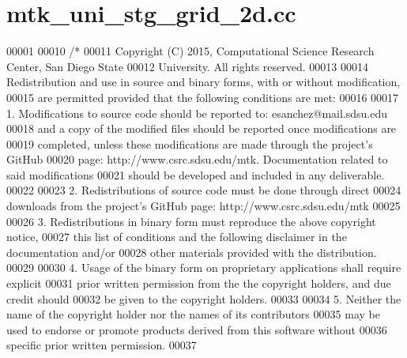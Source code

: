 \hypertarget{mtk__uni__stg__grid__2d_8cc_source}{\section{mtk\+\_\+uni\+\_\+stg\+\_\+grid\+\_\+2d.\+cc}
\label{mtk__uni__stg__grid__2d_8cc_source}
}

\begin{DoxyCode}
00001 
00010 \textcolor{comment}{/*}
00011 \textcolor{comment}{Copyright (C) 2015, Computational Science Research Center, San Diego State}
00012 \textcolor{comment}{University. All rights reserved.}
00013 \textcolor{comment}{}
00014 \textcolor{comment}{Redistribution and use in source and binary forms, with or without modification,}
00015 \textcolor{comment}{are permitted provided that the following conditions are met:}
00016 \textcolor{comment}{}
00017 \textcolor{comment}{1. Modifications to source code should be reported to: esanchez@mail.sdsu.edu}
00018 \textcolor{comment}{and a copy of the modified files should be reported once modifications are}
00019 \textcolor{comment}{completed, unless these modifications are made through the project's GitHub}
00020 \textcolor{comment}{page: http://www.csrc.sdsu.edu/mtk. Documentation related to said modifications}
00021 \textcolor{comment}{should be developed and included in any deliverable.}
00022 \textcolor{comment}{}
00023 \textcolor{comment}{2. Redistributions of source code must be done through direct}
00024 \textcolor{comment}{downloads from the project's GitHub page: http://www.csrc.sdsu.edu/mtk}
00025 \textcolor{comment}{}
00026 \textcolor{comment}{3. Redistributions in binary form must reproduce the above copyright notice,}
00027 \textcolor{comment}{this list of conditions and the following disclaimer in the documentation and/or}
00028 \textcolor{comment}{other materials provided with the distribution.}
00029 \textcolor{comment}{}
00030 \textcolor{comment}{4. Usage of the binary form on proprietary applications shall require explicit}
00031 \textcolor{comment}{prior written permission from the the copyright holders, and due credit should}
00032 \textcolor{comment}{be given to the copyright holders.}
00033 \textcolor{comment}{}
00034 \textcolor{comment}{5. Neither the name of the copyright holder nor the names of its contributors}
00035 \textcolor{comment}{may be used to endorse or promote products derived from this software without}
00036 \textcolor{comment}{specific prior written permission.}
00037 \textcolor{comment}{}

\end{DoxyCode}
